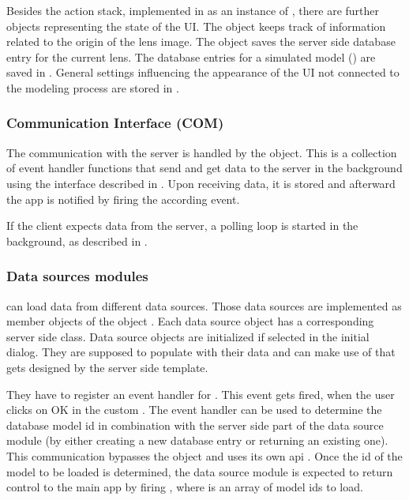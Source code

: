 

Besides the action stack, implemented in  as an instance of , there are further objects representing the state of the UI.
The object  keeps track of information related to the origin of the lens image.
The object  saves the server side database entry for the current lens.
The database entries for a simulated model () are saved in .
General settings influencing the appearance of the UI not connected to the modeling process are stored in .




\subsubsection{Communication Interface (COM)}
The communication with the server is handled by the  object.
This is a collection of event handler functions that send and get data to the server in the background using the interface described in .
Upon receiving data, it is stored and afterward the app is notified by firing the according event.

If the client expects data from the server, a polling loop is started in the background, as described in .


\subsubsection{Data sources modules}

\spl can load data from different data sources.
Those data sources are implemented as member objects of the object .
Each data source object has a corresponding server side class.
Data source objects are initialized if selected in the initial dialog.
They are supposed to populate  with their data and can make use of  that gets designed by the server side template.

They have to register an event handler for .
This event gets fired, when the user clicks on OK in the custom .
The event handler can be used to determine the database model id in combination with the server side part of the data source module (by either creating a new database entry or returning an existing one). This communication bypasses the  object and uses its own api .
Once the id of the model to be loaded is determined, the data source module is expected to return control to the main app by firing , where  is an array of model ids to load.

